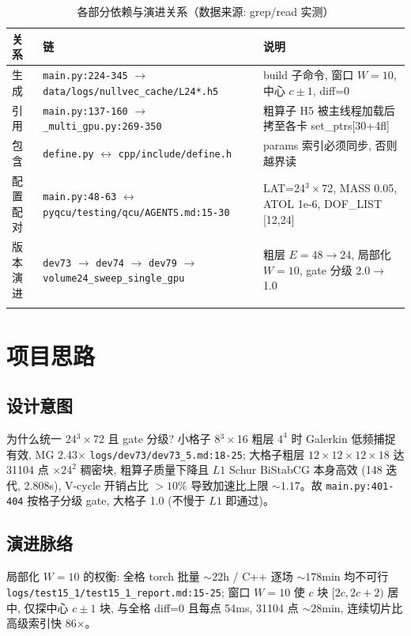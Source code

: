 \documentclass[UTF8]{ctexart}
\begin{document}
\begin{xltabular}{\textwidth}{llX}
\toprule
关系 & 链 & 说明 \\
\midrule
\endhead
生成 & \texttt{\nolinkurl{main.py:224-345}} $\to$ \texttt{\nolinkurl{data/logs/nullvec_cache/L24*.h5}} & build 子命令, 窗口 $W=10$, 中心 $c\pm1$, diff=0 \\
引用 & \texttt{\nolinkurl{main.py:137-160}} $\to$ \texttt{\nolinkurl{_multi_gpu.py:269-350}} & 粗算子 H5 被主线程加载后拷至各卡 set\_ptrs[30+4fl] \\
包含 & \texttt{\nolinkurl{define.py}} $\leftrightarrow$ \texttt{\nolinkurl{cpp/include/define.h}} & params 索引必须同步, 否则越界读 \\
配置配对 & \texttt{\nolinkurl{main.py:48-63}} $\leftrightarrow$ \texttt{\nolinkurl{pyqcu/testing/qcu/AGENTS.md:15-30}} & LAT=24$^3\times$72, MASS 0.05, ATOL 1e-6, DOF\_LIST [12,24] \\
版本演进 & \texttt{\nolinkurl{dev73}} $\to$ \texttt{\nolinkurl{dev74}} $\to$ \texttt{\nolinkurl{dev79}} $\to$ \texttt{\nolinkurl{volume24_sweep_single_gpu}} & 粗层 $E=48\to24$, 局部化 $W=10$, gate 分级 2.0$\to$1.0 \\
\bottomrule
\caption{各部分依赖与演进关系（数据来源: grep/read 实测）}
\end{xltabular}

\section{项目思路}
\subsection{设计意图}
\textcolor{idea}{为什么统一 24$^3\times$72 且 gate 分级?} 小格子 8$^3\times$16 粗层 $4^4$ 时 Galerkin 低频捕捉有效, MG 2.43$\times$ \textcolor{evidence}{\texttt{\nolinkurl{logs/dev73/dev73_5.md:18-25}}}; 大格子粗层 $12\times12\times12\times18$ 达 31104 点 $\times 24^2$ 稠密块, 粗算子质量下降且 $L1$ Schur BiStabCG 本身高效 (148 迭代, 2.808s), V-cycle 开销占比 $>10\%$ 导致加速比上限 $\sim1.17$。故 \texttt{\nolinkurl{main.py:401-404}} 按格子分级 gate, 大格子 1.0 (不慢于 $L1$ 即通过)。

\subsection{演进脉络}
\textcolor{idea}{局部化 $W=10$ 的权衡:} 全格 torch 批量 $\sim22$h / C++ 逐场 $\sim178$min 均不可行 \textcolor{evidence}{\texttt{\nolinkurl{logs/test15_1/test15_1_report.md:15-25}}}; 窗口 $W=10$ 使 $c$ 块 $[2c,2c+2)$ 居中, 仅探中心 $c\pm1$ 块, 与全格 diff=0 且每点 54ms, 31104 点 $\sim28$min, 连续切片比高级索引快 86$\times$。
\end{document}
